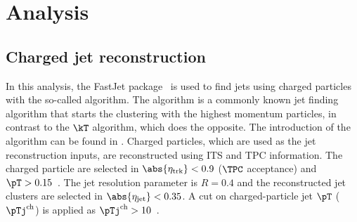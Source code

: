 \documentclass[ALICE,manyauthors]{cernphprep}
\begin{document}
\section{Analysis}%
\label{sec:Analysis}

\subsection{Charged jet reconstruction}%
\label{sec:JetRec}

In this analysis, the FastJet package~\cite{Cacciari:2011ma} is used to find jets using charged particles with the so-called \akT algorithm.
The \akT algorithm is a commonly known jet finding algorithm that starts the clustering with the highest momentum particles, in contrast to the $\kT$ algorithm, which does the opposite.
The introduction of the algorithm can be found in \cite{Cacciari:2008gp}.
Charged particles, which are used as the jet reconstruction inputs, are reconstructed using ITS and TPC information.
The charged particle are selected in $\abs{\eta_{\rm trk}} < 0.9$ ($\TPC$ acceptance) and $\pT> 0.15$~\GeVc.
The jet resolution parameter is $R = 0.4$ and the reconstructed jet clusters are selected in $\abs{\eta_{\rm jet}} < 0.35$.
A cut on charged-particle jet $\pT$ ($\pTj^{\rm ch}$) is applied as $\pTj^{\rm ch} > 10$~\GeVc.
\end{document}
